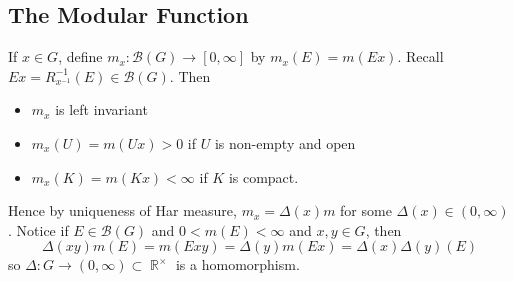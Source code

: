 \documentclass[11pt, a4paper]{memoir}
\DeclareMathOperator{\R}{{\mathbb{R}}}
\theoremstyle{change}
\theoremstyle{plain}
\theoremstyle{nonumberplain}
\numberwithin{equation}{section}
\begin{document}
\subsection{The Modular Function}
If $x\in G$, define $m_x:\mathcal{B}(G)\to[0,\infty]$ by $m_x(E)=m(Ex)$.
Recall $Ex=R_{x^{-1}}^{-1}(E)\in\mathcal{B}(G)$.
Then
\begin{itemize}[nl]
    \item $m_x$ is left invariant
    \item $m_x(U)=m(Ux)>0$ if $U$ is non-empty and open
    \item $m_x(K)=m(Kx)<\infty$ if $K$ is compact.
\end{itemize}
Hence by uniqueness of Har measure, $m_x=\Delta(x)m$ for some $\Delta(x)\in(0,\infty)$.
Notice if $E\in\mathcal{B}(G)$ and $0<m(E)<\infty$ and $x,y\in G$, then
\begin{equation*}
    \Delta(xy)m(E)=m(Exy)=\Delta(y)m(Ex)=\Delta(x)\Delta(y)(E)
\end{equation*}
so $\Delta:G\to(0,\infty)\subset\R^\times$ is a homomorphism.
\end{document}
